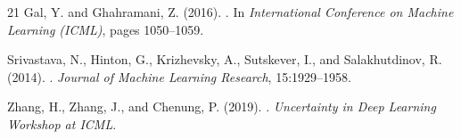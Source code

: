 \documentclass{article}
\begin{document}
\begin{thebibliography}{21}
Gal, Y. and Ghahramani, Z. (2016).
.
\newblock In \emph{International Conference on Machine Learning (ICML)}, pages 1050--1059.

Srivastava, N., Hinton, G., Krizhevsky, A., Sutskever, I., and Salakhutdinov, R. (2014).
.
\newblock \emph{Journal of Machine Learning Research}, 15:1929--1958.

Zhang, H., Zhang, J., and Chenung, P. (2019).
.
\newblock \emph{Uncertainty in Deep Learning Workshop at ICML}.

\end{thebibliography}
\end{document}
